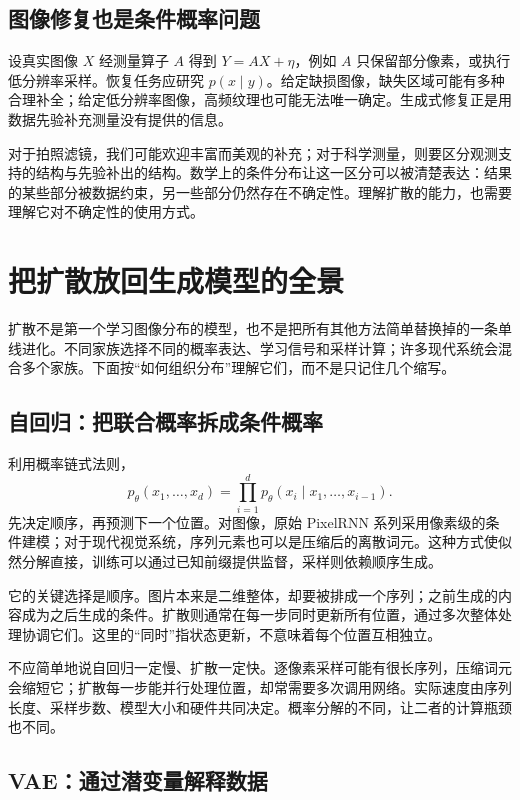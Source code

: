 \subsection{图像修复也是条件概率问题}

设真实图像 $X$ 经测量算子 $A$ 得到 $Y=AX+\eta$，例如 $A$ 只保留部分像素，或执行低分辨率采样。恢复任务应研究 $p(x\mid y)$。给定缺损图像，缺失区域可能有多种合理补全；给定低分辨率图像，高频纹理也可能无法唯一确定。生成式修复正是用数据先验补充测量没有提供的信息。

对于拍照滤镜，我们可能欢迎丰富而美观的补充；对于科学测量，则要区分观测支持的结构与先验补出的结构。数学上的条件分布让这一区分可以被清楚表达：结果的某些部分被数据约束，另一些部分仍然存在不确定性。理解扩散的能力，也需要理解它对不确定性的使用方式。

\section{把扩散放回生成模型的全景}
\label{sec:c-families}

扩散不是第一个学习图像分布的模型，也不是把所有其他方法简单替换掉的一条单线进化。不同家族选择不同的概率表达、学习信号和采样计算；许多现代系统会混合多个家族。下面按“如何组织分布”理解它们，而不是只记住几个缩写。

\subsection{自回归：把联合概率拆成条件概率}

利用概率链式法则，
\[
 p_\theta(x_1,\ldots,x_d)
 =\prod_{i=1}^{d}p_\theta(x_i\mid x_1,\ldots,x_{i-1}).
\]
先决定顺序，再预测下一个位置。对图像，原始 PixelRNN 系列采用像素级的条件建模；对于现代视觉系统，序列元素也可以是压缩后的离散词元。\cite{c_oord2016pixelrnn}这种方式使似然分解直接，训练可以通过已知前缀提供监督，采样则依赖顺序生成。

它的关键选择是顺序。图片本来是二维整体，却要被排成一个序列；之前生成的内容成为之后生成的条件。扩散则通常在每一步同时更新所有位置，通过多次整体处理协调它们。这里的“同时”指状态更新，不意味着每个位置互相独立。

不应简单地说自回归一定慢、扩散一定快。逐像素采样可能有很长序列，压缩词元会缩短它；扩散每一步能并行处理位置，却常需要多次调用网络。实际速度由序列长度、采样步数、模型大小和硬件共同决定。概率分解的不同，让二者的计算瓶颈也不同。

\subsection{VAE：通过潜变量解释数据}

